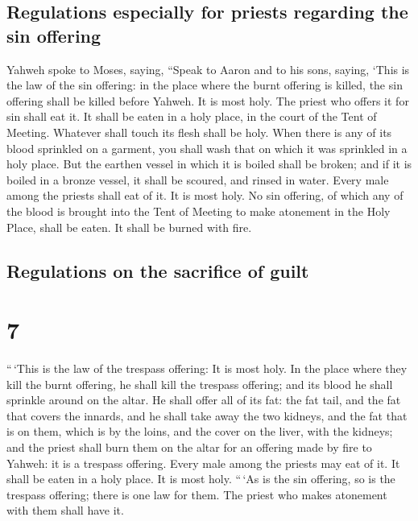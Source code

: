 \hypertarget{regulations-especially-for-priests-regarding-the-sin-offering}{%
\subsection{Regulations especially for priests regarding the sin
offering}\label{regulations-especially-for-priests-regarding-the-sin-offering}}

 Yahweh spoke to Moses, saying,  ``Speak
to Aaron and to his sons, saying, `This is the law of the sin offering:
in the place where the burnt offering is killed, the sin offering shall
be killed before Yahweh. It is most holy.  The priest who
offers it for sin shall eat it. It shall be eaten in a holy place, in
the court of the Tent of Meeting.  Whatever shall touch
its flesh shall be holy. When there is any of its blood sprinkled on a
garment, you shall wash that on which it was sprinkled in a holy place.
 But the earthen vessel in which it is boiled shall be
broken; and if it is boiled in a bronze vessel, it shall be scoured, and
rinsed in water.  Every male among the priests shall eat
of it. It is most holy.  No sin offering, of which any of
the blood is brought into the Tent of Meeting to make atonement in the
Holy Place, shall be eaten. It shall be burned with fire.

\hypertarget{regulations-on-the-sacrifice-of-guilt}{%
\subsection{Regulations on the sacrifice of
guilt}\label{regulations-on-the-sacrifice-of-guilt}}

\hypertarget{section-6}{%
\section{7}\label{section-6}}

 ``\,`This is the law of the trespass offering: It is most
holy.  In the place where they kill the burnt offering, he
shall kill the trespass offering; and its blood he shall sprinkle around
on the altar.  He shall offer all of its fat: the fat
tail, and the fat that covers the innards,  and he shall
take away the two kidneys, and the fat that is on them, which is by the
loins, and the cover on the liver, with the kidneys;  and
the priest shall burn them on the altar for an offering made by fire to
Yahweh: it is a trespass offering.  Every male among the
priests may eat of it. It shall be eaten in a holy place. It is most
holy.  ``\,`As is the sin offering, so is the trespass
offering; there is one law for them. The priest who makes atonement with
them shall have it.

